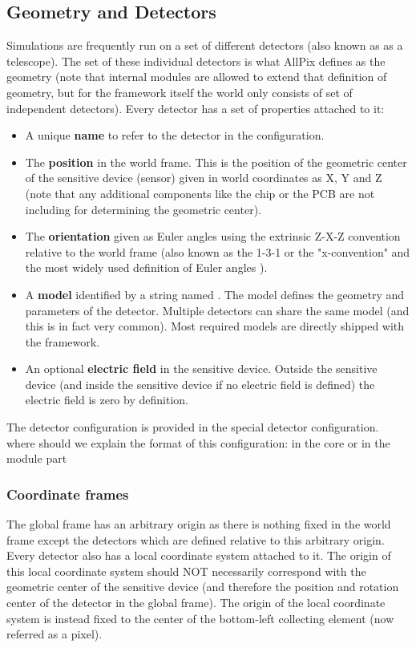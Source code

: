 \subsection{Geometry and Detectors}
\label{sec:models_geometry}
Simulations are frequently run on a set of different detectors (also known as as a telescope). The set of these individual detectors is what AllPix defines as the geometry (note that internal modules are allowed to extend that definition of geometry, but for the framework itself the world only consists of set of independent detectors). Every detector has a set of properties attached to it:
\begin{itemize}
\item A unique \textbf{name} to refer to the detector in the configuration.
\item The \textbf{position} in the world frame. This is the position of the geometric center of the sensitive device (sensor) given in world coordinates as X, Y and Z (note that any additional components like the chip or the PCB are not including for determining the geometric center).
\item The \textbf{orientation} given as Euler angles using the extrinsic Z-X-Z convention relative to the world frame (also known as the 1-3-1 or the "x-convention" and the most widely used definition of Euler angles \needcite). 
\item A \textbf{model} identified by a string named . The model defines the geometry and parameters of the detector. Multiple detectors can share the same model (and this is in fact very common). Most required models are directly shipped with the framework.
\item An optional \textbf{electric field} in the sensitive device. Outside the sensitive device (and inside the sensitive device if no electric field is defined) the electric field is zero by definition.
\end{itemize}

The detector configuration is provided in the special detector configuration. \todo where should we explain the format of this configuration: in the core or in the module part \todo

\subsubsection{Coordinate frames}
The global frame has an arbitrary origin as there is nothing fixed in the world frame except the detectors which are defined relative to this arbitrary origin. Every detector also has a local coordinate system attached to it. The origin of this local coordinate system should NOT necessarily correspond with the geometric center of the sensitive device (and therefore the position and rotation center of the detector in the global frame). The origin of the local coordinate system is instead fixed to the center of the bottom-left collecting element (now referred as a pixel). 

